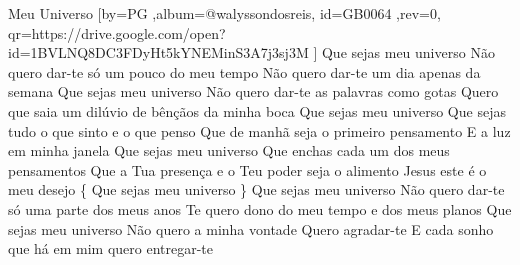 \beginsong
{Meu Universo %
}[by={PG %
},album={@walyssondosreis},
id={GB0064 %
},rev={0}, %
qr={https://drive.google.com/open?id=1BVLNQ8DC3FDyHt5kYNEMinS3A7j3sj3M %
}]
\beginverse*
Que sejas meu universo
Não quero dar-te só um pouco do meu tempo
Não quero dar-te um dia apenas da semana
\endverse
\beginverse*
Que sejas meu universo
Não quero dar-te as palavras como gotas
Quero que saia um dilúvio de bênçãos da minha boca
\endverse
\beginchorus
Que sejas meu universo
Que sejas tudo o que sinto e o que penso
Que de manhã seja o primeiro pensamento
E a luz em minha janela
Que sejas meu universo
Que enchas cada um dos meus pensamentos
Que a Tua presença e o Teu poder seja o alimento
Jesus este é o meu desejo
\{ Que sejas meu universo \}
\endchorus
\beginverse*
Que sejas meu universo
Não quero dar-te só uma parte dos meus anos
Te quero dono do meu tempo e dos meus planos
\endverse
\beginverse*
Que sejas meu universo
Não quero a minha vontade
Quero agradar-te
E cada sonho que há em mim quero entregar-te
\endverse

